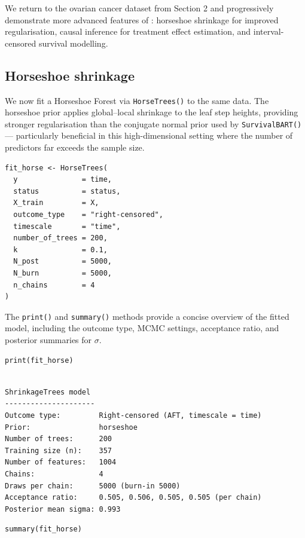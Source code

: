 We return to the ovarian cancer dataset from Section 2 and progressively demonstrate more advanced features of : horseshoe shrinkage for improved regularisation, causal inference for treatment effect estimation, and interval-censored survival modelling.

\subsection{Horseshoe shrinkage}\label{horseshoe-shrinkage}

We now fit a Horseshoe Forest via \texttt{HorseTrees()} to the same data. The horseshoe prior applies global--local shrinkage to the leaf step heights, providing stronger regularisation than the conjugate normal prior used by \texttt{SurvivalBART()} --- particularly beneficial in this high-dimensional setting where the number of predictors far exceeds the sample size.

\begin{verbatim}
fit_horse <- HorseTrees(
  y               = time,
  status          = status,
  X_train         = X,
  outcome_type    = "right-censored",
  timescale       = "time",
  number_of_trees = 200,
  k               = 0.1,
  N_post          = 5000,
  N_burn          = 5000,
  n_chains        = 4
)
\end{verbatim}

The \texttt{print()} and \texttt{summary()} methods provide a concise overview of the fitted model, including the outcome type, MCMC settings, acceptance ratio, and posterior summaries for \(\sigma\).

\begin{verbatim}
print(fit_horse)
\end{verbatim}

\begin{verbatim}

ShrinkageTrees model
---------------------
Outcome type:         Right-censored (AFT, timescale = time)
Prior:                horseshoe
Number of trees:      200
Training size (n):    357
Number of features:   1004
Chains:               4
Draws per chain:      5000 (burn-in 5000)
Acceptance ratio:     0.505, 0.506, 0.505, 0.505 (per chain)
Posterior mean sigma: 0.993
\end{verbatim}

\begin{verbatim}
summary(fit_horse)
\end{verbatim}

